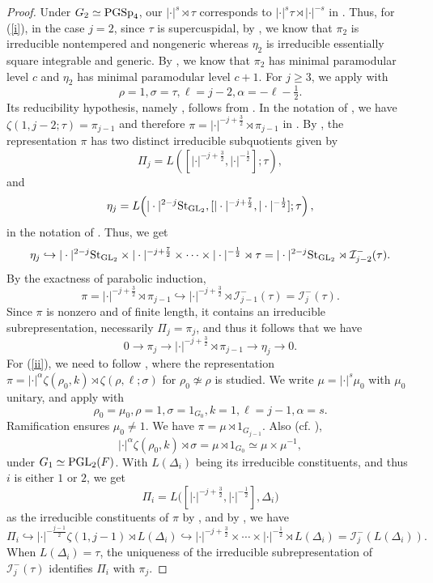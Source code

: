\documentclass[12pt]{amsart}
\theoremstyle{definition}
\theoremstyle{remark}
\begin{document}
\begin{proof}
Under $G_2\simeq{\rm PGSp}_4$, our $|\cdot|^s\rtimes\tau$ corresponds to $|\cdot|^s\tau\rtimes|\cdot|^{-s}$ in \cite{rs07}. Thus, for (\ref{i}), in the case $j=2$, since $\tau$ is supercuspidal, by \cite[Group XI on p. 40 and Proposition 5.5.1 (iv)]{rs07}, we know that $\pi_2$ is irreducible nontempered and nongeneric whereas $\eta_2$ is irreducible essentially square integrable and generic. By \cite[Proposition 5.5.5]{rs07}, we know that 
$\pi_2$ has minimal paramodular level $c$ and $\eta_2$ has minimal paramodular level $c+1$. 
For $j\geq3$, we apply \cite[Proposition 3.1 (2)]{jan96} with
\[
\rho=1, \sigma=\tau,
\ell=j-2,\alpha=-\ell-\tfrac12.
\]
Its reducibility hypothesis, namely \cite[C1/2 on p.6]{jan96}, follows from \cite[Groups X and XI on p. 40]{rs07}. In the notation of \cite[p. 1]{jan96}, we have $\zeta(1,j-2;\tau)=\pi_{j-1}$ and therefore $\pi = |\cdot|^{-j+\frac{3}{2}}\rtimes\pi_{j-1}$ in \cite[Proposition 3.1]{jan96}. By \cite[Proposition 3.1 (2)]{jan96}, the representation $\pi$ has two distinct irreducible subquotients given by 
\[
\Pi_j = L([|\cdot|^{-j+\frac{3}{2}},|\cdot|^{-\frac{1}{2}}];\tau),
\]
and
\[
\eta_j
=
L\!\left(
|\cdot|^{2-j}{\rm St}_{{\rm GL}_2},
[|\cdot|^{-j+\frac{7}{2}},|\cdot|^{-\frac{1}{2}}];\tau
\right),
\]
in the notation of \cite[p. 5]{jan96}.
Thus, we get
\[
\eta_j\hookrightarrow
|\cdot|^{2-j}{\rm St}_{{\rm GL}_2}
\times|\cdot|^{-j+\frac{7}{2}}\times\cdots\times|\cdot|^{-\frac{1}{2}}
\rtimes\tau
=
|\cdot|^{2-j}{\rm St}_{{\rm GL}_2}\rtimes
\mathcal I_{j-2}^-(\tau).
\]
By the exactness of parabolic induction,
\[
\pi= |\cdot|^{-j+\frac{3}{2}}\rtimes\pi_{j-1}
\hookrightarrow
|\cdot|^{-j+\frac{3}{2}}\rtimes\mathcal I_{j-1}^-(\tau)
=\mathcal I_j^-(\tau).
\]
Since $\pi$ is nonzero and of finite length, it contains an irreducible subrepresentation, necessarily $\Pi_j=\pi_j$, and thus it follows that we have
\[
0\rightarrow\pi_j
\rightarrow|\cdot|^{-j+\frac{3}{2}}\rtimes\pi_{j-1}
\rightarrow\eta_j
\rightarrow 0.
\]
For (\ref{ii}), we need to follow \cite[\S 5]{jan96}, where the representation 
$\pi = |\cdot|^\alpha \zeta(\rho_0, k) \rtimes \zeta (\rho,\ell;\sigma)$ for $\rho_0 \not\simeq \rho$ is studied. We write $\mu=|\cdot|^s\mu_0$ with $\mu_0$ unitary, and apply \cite[Lemma 5.4 (1)]{jan96} with
\[
\rho_0=\mu_0, \rho=1,
\sigma=1_{G_0}, k=1,
\ell=j-1, \alpha=s.
\]
Ramification ensures $\mu_0\neq1$. We have $\pi = \mu\rtimes1_{G_{j-1}}$. Also (cf. \cite[Proposition 5.3]{jan96}),
\[
|\cdot|^\alpha\zeta(\rho_0,k)\rtimes\sigma
=\mu\rtimes1_{G_0}
\simeq\mu\times\mu^{-1},
\]
under $G_1\simeq{\rm PGL}_2(F)$. With $L(\Delta_i)$ being its irreducible constituents, and thus $i$ is either $1$ or $2$, we get  
\[
\Pi_i=L\bigl([|\cdot|^{-j+\frac{3}{2}},|\cdot|^{-\frac{1}{2}}],\Delta_i\bigr)
\]
as the irreducible constituents of $\pi$ by \cite[Proposition 5.3]{jan96}, and by \cite[Lemma 5.4 (1)]{jan96}, we have 
\[
\Pi_i
\hookrightarrow
|\cdot|^{-\frac{j-1}{2}}\zeta(1,j-1)\rtimes L(\Delta_i)
\hookrightarrow
|\cdot|^{-j+\frac{3}{2}}\times\cdots\times|\cdot|^{-\frac{1}{2}}\rtimes L(\Delta_i)
=\mathcal I_j^-(L(\Delta_i)).
\]
When $L(\Delta_i)=\tau$, the uniqueness of the irreducible subrepresentation of $\mathcal I_j^-(\tau)$ identifies $\Pi_i$ with $\pi_j$.
\end{proof}
\end{document}
